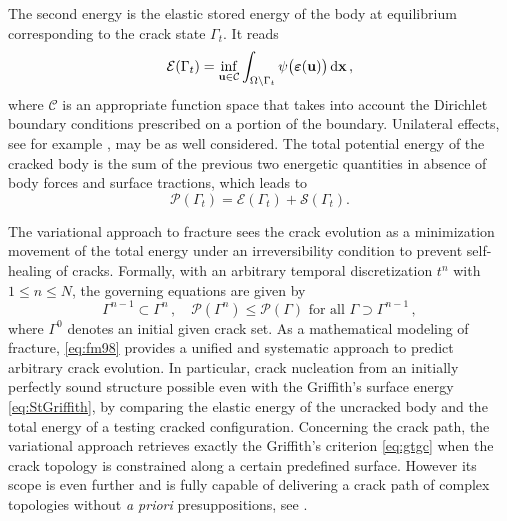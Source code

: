 The second energy is the elastic stored energy of the body at equilibrium corresponding to the crack state $\Gamma_t$. It reads
\begin{equation} \label{eq:EGamma}
\mathcal{E}(\Gamma_t)=\inf_{\vec{u}\in\mathcal{C}}\int_{\Omega\setminus\Gamma_t}\psi\bigl(\eps(\vec{u})\bigr)\dx\,,
\end{equation}
where $\mathcal{C}$ is an appropriate function space that takes into account the Dirichlet boundary conditions prescribed on a portion of the boundary. Unilateral effects, see for example \cite{FrancfortMarigo:1998,AmorMarigoMaurini:2009}, may be as well considered. The total potential energy of the cracked body is the sum of the previous two energetic quantities in absence of body forces and surface tractions, which leads to
\begin{equation} \label{eq:PES}
\mathcal{P}(\Gamma_t)=\mathcal{E}(\Gamma_t)+\mathcal{S}(\Gamma_t).
\end{equation}

The variational approach to fracture sees the crack evolution as a minimization movement of the total energy under an irreversibility condition to prevent self-healing of cracks. Formally, with an arbitrary temporal discretization $t^n$ with $1\leq n\leq N$, the governing equations are given by
\begin{equation} \label{eq:fm98}
\Gamma^{n-1}\subset\Gamma^n\,,\quad \mathcal{P}(\Gamma^n)\leq\mathcal{P}(\Gamma)\text{ for all $\Gamma\supset\Gamma^{n-1}$}\,,
\end{equation}
where $\Gamma^0$ denotes an initial given crack set. As a mathematical modeling of fracture, \eqref{eq:fm98} provides a unified and systematic approach to predict arbitrary crack evolution. In particular, crack nucleation from an initially perfectly sound structure possible even with the Griffith's surface energy \eqref{eq:StGriffith}, by comparing the elastic energy of the uncracked body and the total energy of a testing cracked configuration. Concerning the crack path, the variational approach retrieves exactly the Griffith's criterion \eqref{eq:gtgc} when the crack topology is constrained along a certain predefined surface. However its scope is even further and is fully capable of delivering a crack path of complex topologies without \emph{a priori} presuppositions, see \cite{BourdinFrancfortMarigo:2008}.


